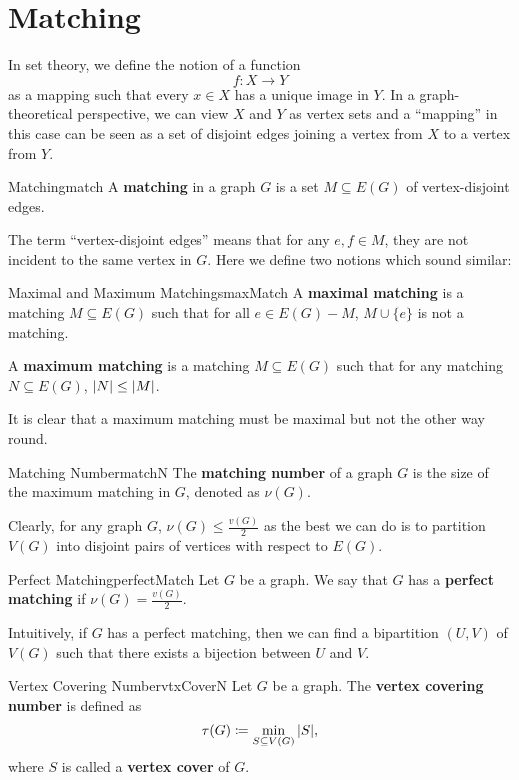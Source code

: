\documentclass[math, code]{amznotes}
\theoremstyle{remark}
\begin{document}
\section{Matching}
In set theory, we define the notion of a function
\begin{equation*}
    f \colon X \to Y
\end{equation*}
as a mapping such that every $x \in X$ has a unique image in $Y$. In a graph-theoretical perspective, we can view $X$ and $Y$ as vertex sets and a ``mapping'' in this case can be seen as a set of disjoint edges joining a vertex from $X$ to a vertex from $Y$.
\begin{dfnbox}{Matching}{match}
    A {\color{red} \textbf{matching}} in a graph $G$ is a set $M \subseteq E(G)$ of vertex-disjoint edges.
\end{dfnbox}
The term ``vertex-disjoint edges'' means that for any $e, f \in M$, they are not incident to the same vertex in $G$. Here we define two notions which sound similar:
\begin{dfnbox}{Maximal and Maximum Matchings}{maxMatch}
    A {\color{red} \textbf{maximal matching}} is a matching $M \subseteq E(G)$ such that for all $e \in E(G) - M$, $M \cup \{e\}$ is not a matching.

    A {\color{red} \textbf{maximum matching}} is a matching $M \subseteq E(G)$ such that for any matching $N \subseteq E(G)$, ${\left\lvert {N} \right\rvert} \leq {\left\lvert {M} \right\rvert}$.
\end{dfnbox}
It is clear that a maximum matching must be maximal but not the other way round.
\begin{dfnbox}{Matching Number}{matchN}
    The {\color{red} \textbf{matching number}} of a graph $G$ is the size of the maximum matching in $G$, denoted as $\nu(G)$.
\end{dfnbox}
Clearly, for any graph $G$, $\nu(G) \leq \frac{v(G)}{2}$ as the best we can do is to partition $V(G)$ into disjoint pairs of vertices with respect to $E(G)$.
\begin{dfnbox}{Perfect Matching}{perfectMatch}
    Let $G$ be a graph. We say that $G$ has a {\color{red} \textbf{perfect matching}} if $\nu(G) = \frac{v(G)}{2}$.
\end{dfnbox}
Intuitively, if $G$ has a perfect matching, then we can find a bipartition $(U, V)$ of $V(G)$ such that there exists a bijection between $U$ and $V$.
\begin{dfnbox}{Vertex Covering Number}{vtxCoverN}
    Let $G$ be a graph. The {\color{red} \textbf{vertex covering number}} is defined as 
    \begin{equation*}
        \tau(G) \coloneqq \min_{S \subseteq V(G)}{\left\lvert {S} \right\rvert},
    \end{equation*}
    where $S$ is called a {\color{red} \textbf{vertex cover}} of $G$.    
\end{dfnbox}
\end{document}
